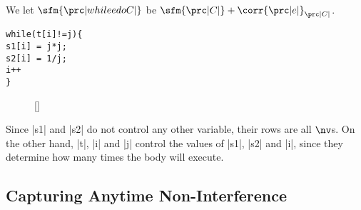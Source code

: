 \begin{definition}[Loop]
We let \(\sfm{\prc|while e do C|}\) be \(\sfm{\prc|C|} + \corr{\prc|e|}_{\prc|C|}\).
\end{definition}

\newsavebox\whilec
\begin{lrbox}{\whilec}
\begin{lstlisting}[mathescape]
while(t[i]!=j){
s1[i] = j*j;
s2[i] = 1/j;
i++
}
\end{lstlisting}
\end{lrbox}

\noindent
\begin{minipage}{\textwidth}
\begin{wrapfigure}{r}{0pt}
\raisebox{0pt}[\dimexpr{}\baselineskip\relax]{
}\end{wrapfigure}
Since \prc|s1| and \prc|s2| do not control any other variable, their rows are all $\nv$s.
On the other hand, \prc|t|, \prc|i| and \prc|j| control the values of \prc|s1|, \prc|s2| and \prc|i|, since they determine how many times the body will execute.
\end{minipage}



\subsection{Capturing Anytime Non-Interference}%
\label{sec:soundness}

